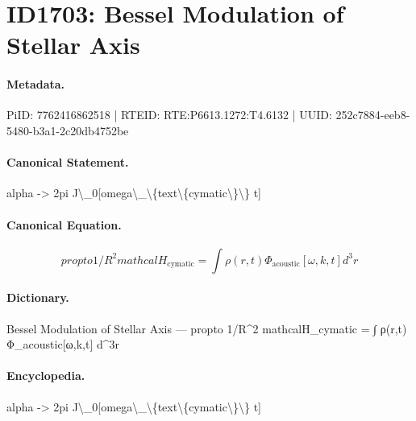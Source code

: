 \section*{ID1703: Bessel Modulation of Stellar Axis}
\paragraph{Metadata.}
PiID: 7762416862518 | RTEID: RTE:P6613.1272:T4.6132 | UUID: 252c7884-eeb8-5480-b3a1-2c20db4752be

\paragraph{Canonical Statement.}
alpha -> 2pi J\textbackslash{}\_0[omega\textbackslash{}\_\textbackslash{}\{text\textbackslash{}\{cymatic\textbackslash{}\}\textbackslash{}\} t]

\paragraph{Canonical Equation.}
\[
propto 1/R^2 mathcal{H}_{\text{cymatic}} = \int \rho(r,t) \Phi_{\text{acoustic}}[\omega,k,t] d^3r
\]

\paragraph{Dictionary.}
Bessel Modulation of Stellar Axis — propto 1/R\textasciicircum{}2 mathcalH\_cymatic = ∫ ρ(r,t) Φ\_acoustic[ω,k,t] d\textasciicircum{}3r

\paragraph{Encyclopedia.}
alpha -> 2pi J\textbackslash{}\_0[omega\textbackslash{}\_\textbackslash{}\{text\textbackslash{}\{cymatic\textbackslash{}\}\textbackslash{}\} t]
